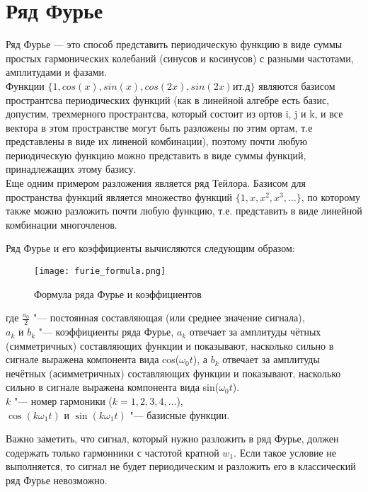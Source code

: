 \chapter{Ряд Фурье}
\label{ch:intro}

Ряд Фурье — это способ представить периодическую функцию в виде суммы простых гармонических колебаний 
(синусов и косинусов) с разными частотами, амплитудами и фазами. \\

Функции $\{1, cos(x), sin(x), cos(2x), sin(2x) и т.д\}$ являются базисом пространтсва периодических функций (как в линейной алгебре
есть базис, допустим, трехмерного пространтсва, который состоит из ортов i, j и k, и все вектора в этом пространстве могут быть
разложены по этим ортам, т.е представлены в виде их линеной комбинации), поэтому почти любую периодическую функцию можно представить
в виде суммы функций, принадлежащих этому базису. \\

Еще одним примером разложения является ряд Тейлора. Базисом для пространства функций является множество функций $\{1, x, x^2, x^3, \dots\}$,
по которому также можно разложить почти любую функцию, т.е. представить в виде линейной комбинации многочленов.

Ряд Фурье и его коэффициенты вычисляются следующим образом:

\begin{figure}[ht]
    \centering
    \texttt{[image: furie\_formula.png]}
    \caption{Формула ряда Фурье и коэффициентов}
\end{figure}

где $\frac{a_0}{2}$ "--- постоянная составляющая (или среднее значение сигнала), \\
$a_k$ и $b_k$ "--- коэффициенты ряда Фурье, $a_k$ отвечает за амплитуды чётных (симметричных) составляющих функции
и показывают, насколько сильно в сигнале выражена компонента вида cos($\omega_0t$), а $b_k$ отвечает за амплитуды нечётных (асимметричных) составляющих функции
и показывают, насколько сильно в сигнале выражена компонента вида sin($\omega_0t$). \\
$k$ "--- номер гармоники ($k = 1,2,3,4,\dots$), \\
$\cos(k\omega_1 t)$ и $\sin(k\omega_1 t)$ "--- базисные функции.

Важно заметить, что сигнал, который нужно разложить в ряд Фурье, должен содержать только гармонники с частотой кратной $w_1$. Если
такое условие не выполняется, то сигнал не будет периодическим и разложить его в классический ряд Фурье невозможно.

